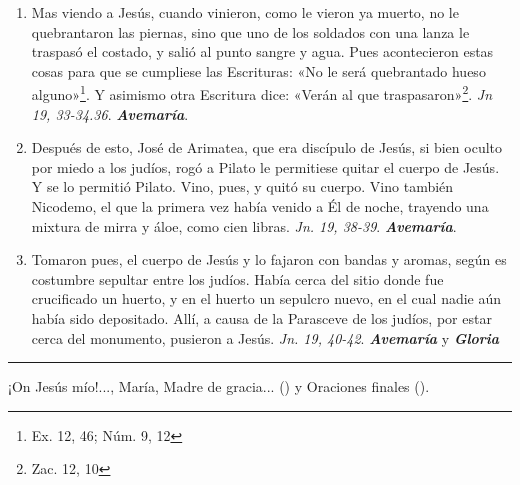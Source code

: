\documentclass[./rosary.tex]{subfiles}
\begin{document}
\begin{enumerate}
    \item Mas viendo a Jesús, cuando vinieron, como le vieron ya muerto, no le quebrantaron las piernas, sino que uno de los soldados
          con una lanza le traspasó el costado, y salió al punto sangre y agua. Pues acontecieron estas cosas para que se cumpliese las
          Escrituras: «No le será quebrantado hueso alguno»\footnote{Ex. 12, 46; Núm. 9, 12}. Y asimismo otra Escritura dice: «Verán al que
          traspasaron»\footnote{Zac. 12, 10}. \emph{Jn 19, 33-34.36}. \textbf{\emph{Avemaría}}.

    \item Después de esto, José de Arimatea, que era discípulo de Jesús, si bien oculto por miedo a los judíos, rogó a Pilato le permitiese
          quitar el cuerpo de Jesús. Y se lo permitió Pilato. Vino, pues, y quitó su cuerpo. Vino también Nicodemo, el que la primera vez había
          venido a Él de noche, trayendo una mixtura de mirra y áloe, como cien libras.
          \emph{Jn. 19, 38-39}. \textbf{\emph{Avemaría}}.

    \item Tomaron pues, el cuerpo de Jesús y lo fajaron con bandas y aromas, según es costumbre sepultar entre los judíos. Había cerca
          del sitio donde fue crucificado un huerto, y en el huerto un sepulcro nuevo, en el cual nadie aún había sido depositado.
          Allí, a causa de la Parasceve de los judíos, por estar cerca del monumento, pusieron a Jesús.
          \emph{Jn. 19, 40-42}. \textbf{\emph{Avemaría}} y \textbf{\emph{Gloria}}
\end{enumerate}

\rule{\textwidth}{0.5pt}
¡On Jesús mío!..., María, Madre de gracia... () y Oraciones finales ().
\end{document}
